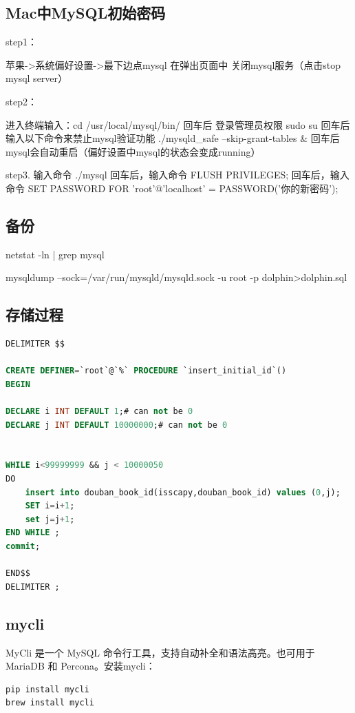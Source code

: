 \documentclass[letter]{book}
\begin{document}
\subsection{Mac中MySQL初始密码}

step1：

苹果->系统偏好设置->最下边点mysql 在弹出页面中 关闭mysql服务（点击stop mysql server）

step2：

进入终端输入：cd /usr/local/mysql/bin/
回车后 登录管理员权限 sudo su
回车后输入以下命令来禁止mysql验证功能 ./mysqld\_safe --skip-grant-tables \&
回车后mysql会自动重启（偏好设置中mysql的状态会变成running）

step3. 
输入命令 ./mysql
回车后，输入命令 FLUSH PRIVILEGES; 
回车后，输入命令 SET PASSWORD FOR 'root'@'localhost' = PASSWORD('你的新密码');

\subsection{备份}

netstat -ln | grep mysql

mysqldump --sock=/var/run/mysqld/mysqld.sock -u root -p dolphin>dolphin.sql

\subsection{存储过程}

\begin{lstlisting}[language=SQL]
DELIMITER $$

CREATE DEFINER=`root`@`%` PROCEDURE `insert_initial_id`()
BEGIN  

DECLARE i INT DEFAULT 1;# can not be 0  
DECLARE j INT DEFAULT 10000000;# can not be 0  


WHILE i<99999999 && j < 10000050
DO  
	insert into douban_book_id(isscapy,douban_book_id) values (0,j);  
	SET i=i+1;  
	set j=j+1;
END WHILE ;  
commit;  

END$$
DELIMITER ;
\end{lstlisting}


\subsection{mycli}

MyCli 是一个 MySQL 命令行工具，支持自动补全和语法高亮。也可用于 MariaDB 和 Percona。安装mycli：

\begin{lstlisting}[language=Bash]
pip install mycli
brew install mycli
\end{lstlisting}
\end{document}
